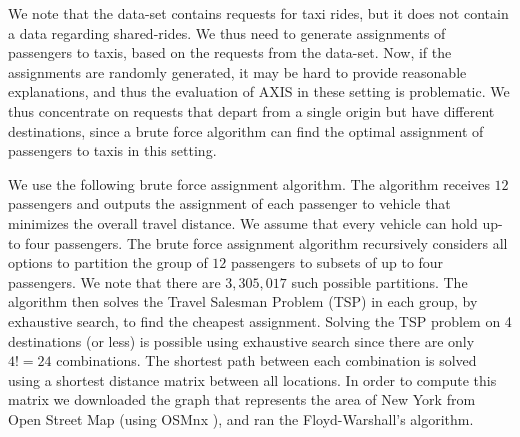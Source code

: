 \documentclass[letterpaper]{article} %
\begin{document}
We note that the data-set contains requests for taxi rides, but it does not contain a data regarding shared-rides. We thus need to generate assignments of passengers to taxis, based on the requests from the data-set. Now, if the assignments are randomly generated, it may be hard to provide reasonable explanations, and thus the evaluation of AXIS in these setting is problematic. We thus concentrate on requests that depart from a single origin but have different destinations, since a brute force algorithm can find the optimal assignment of passengers to taxis in this setting.

We use the following brute force assignment algorithm. The algorithm receives $12$ passengers and outputs the assignment of each passenger to vehicle that minimizes the overall travel distance. We assume that every vehicle can hold up-to four passengers.
The brute force assignment algorithm recursively considers all options to partition the group of $12$ passengers to subsets of up to four passengers. We note that there are $3,305,017$ such possible partitions. %
The algorithm then solves the 
Travel Salesman Problem (TSP) in each group, by exhaustive search, to find the cheapest assignment. 
%
Solving the TSP problem on 4 destinations (or less) is possible using exhaustive search since there are only $4!=24$ combinations. The shortest path between each combination is solved using a shortest distance matrix between all locations. 
In order to compute this matrix we downloaded the graph that represents the area of New York from Open Street Map (using OSMnx \cite{boeing2017osmnx}), and ran the Floyd-Warshall's algorithm. 

\end{document}

